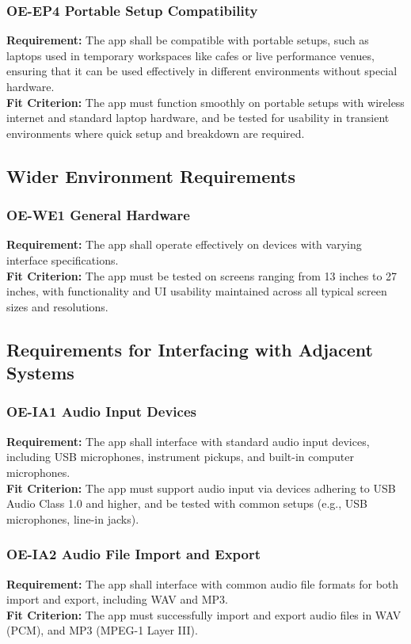 \documentclass[12pt]{article}
\begin{document}
\subsubsection*{OE-EP4 Portable Setup Compatibility} \label{OE-EP4}
\textbf{Requirement:} The app shall be compatible with portable setups, such as laptops used in temporary workspaces like cafes or live performance venues, ensuring that it can be used effectively in different environments without special hardware.\\
\textbf{Fit Criterion:} The app must function smoothly on portable setups with wireless internet and standard laptop hardware, and be tested for usability in transient environments where quick setup and breakdown are required.

\subsection{Wider Environment Requirements}
\subsubsection*{OE-WE1 General Hardware} \label{OE-WE1}
\textbf{Requirement:} The app shall operate effectively on devices with varying interface specifications.\\
\textbf{Fit Criterion:} The app must be tested on screens ranging from 13 inches to 27 inches, with functionality and UI usability maintained across all typical screen sizes and resolutions.

\subsection{Requirements for Interfacing with Adjacent Systems}
\subsubsection*{OE-IA1 Audio Input Devices} \label{OE-IA1}
\textbf{Requirement:} The app shall interface with standard audio input devices, including USB microphones, instrument pickups, and built-in computer microphones.\\
\textbf{Fit Criterion:} The app must support audio input via devices adhering to USB Audio Class 1.0 and higher, and be tested with common setups (e.g., USB microphones, line-in jacks).\\
\subsubsection*{OE-IA2 Audio File Import and Export} \label{OE-IA2}
\textbf{Requirement:} The app shall interface with common audio file formats for both import and export, including WAV and MP3.\\
\textbf{Fit Criterion:} The app must successfully import and export audio files in WAV (PCM), and MP3 (MPEG-1 Layer III).\\
\end{document}
